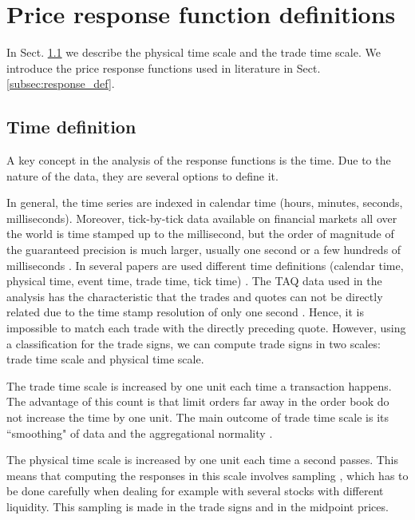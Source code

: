 \section{Price response function definitions}
\label{sec:response_functions_def}

In Sect. \ref{subsec:time_definition} we describe the physical time scale and
the trade time scale. We introduce the price response functions used in
literature in Sect. \ref{subsec:response_def}.

\subsection{Time definition}\label{subsec:time_definition}

A key concept in the analysis of the response functions is the time. Due to the
nature of the data, they are several options to define it.

In general, the time series are indexed in calendar time (hours, minutes,
seconds, milliseconds). Moreover, tick-by-tick data available on financial
markets all over the world is time stamped up to the millisecond, but the order
of magnitude of the guaranteed precision is much larger, usually one second or
a few hundreds of milliseconds \cite{empirical_facts,market_digest}. In several papers are
used different time definitions (calendar time, physical time, event time,
trade time, tick time) \cite{empirical_facts,sampling_returns,market_making}.
The TAQ data used in the analysis has the characteristic that the trades and
quotes can not be directly related due to the time stamp resolution of only one
second \cite{Wang_2016_cross}. Hence, it is impossible to match each trade with
the directly preceding quote. However, using a classification for the trade
signs, we can compute trade signs in two scales: trade time scale and physical
time scale.

The trade time scale is increased by one unit each time a transaction happens.
The advantage of this count is that limit orders far away in the order book do
not increase the time by one unit. The main outcome of trade time scale is its
``smoothing" of data and the aggregational normality \cite{empirical_facts}.

The physical time scale is increased by one unit each time a second passes.
This means that computing the responses in this scale involves sampling
\cite{sampling_returns,Wang_2016_cross}, which has to be done carefully when
dealing for example with several stocks with different liquidity. This sampling
is made in the trade signs and in the midpoint prices.

